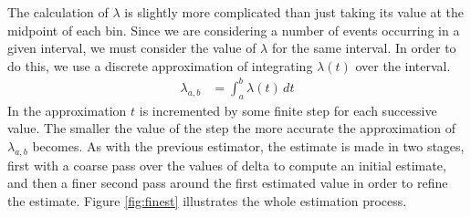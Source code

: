\documentclass[a4paper,11pt,twoside]{article}
\begin{document}
   The calculation of $\lambda$ is slightly more complicated than just taking
   its value at the midpoint of each bin. Since we are considering a number of
   events occurring in a given interval, we must consider the value of $\lambda$
   for the same interval. In order to do this, we use a discrete approximation
   of integrating $\lambda(t)$ over the interval.
   \begin{align}
   \lambda_{a,b}&=\int_a^b\lambda(t)\,dt
   \end{align}
   In the approximation $t$ is incremented by some finite step for each
   successive value. The smaller the value of the step the more accurate the
   approximation of $\lambda_{a,b}$ becomes. As with the previous estimator, the
   estimate is made in two stages, first with a coarse pass over the values of
   delta to compute an initial estimate, and then a finer second pass around the
   first estimated value in order to refine the estimate. Figure
   \ref{fig:finest} illustrates the whole estimation process.
\end{document}
